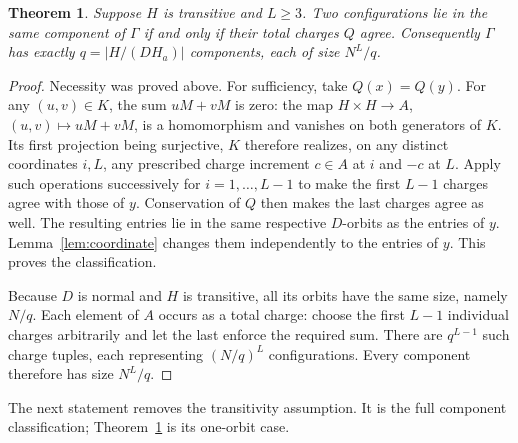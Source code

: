 \documentclass[11pt]{article}
\newtheorem{theorem}{Theorem}
\theoremstyle{remark}
\begin{document}
\begin{theorem}\label{thm:components}
Suppose $H$ is transitive and $L\geq3$. Two configurations lie in the same
component of $\Gamma$ if and only if their total charges $Q$ agree.
Consequently $\Gamma$ has exactly $q=|H/(D H_a)|$ components, each of size
$N^L/q$.
\end{theorem}
\begin{proof}
Necessity was proved above. For sufficiency, take $Q(x)=Q(y)$.
For any $(u,v)\in K$, the sum $uM+vM$ is zero: the map
$H\times H\to A$, $(u,v)\mapsto uM+vM$, is a homomorphism and vanishes on
both generators of $K$.
Its first projection being surjective, $K$ therefore realizes, on any distinct
coordinates $i,L$, any prescribed charge increment $c\in A$ at $i$ and $-c$
at $L$. Apply such operations successively for $i=1,\ldots,L-1$ to make the
first $L-1$ charges agree with those of $y$.
Conservation of $Q$ then makes the last charges agree as well.
The resulting entries lie in the same respective $D$-orbits as the entries of
$y$. Lemma~\ref{lem:coordinate} changes them independently to the entries of
$y$. This proves the classification.

Because $D$ is normal and $H$ is transitive, all its orbits have the same size,
namely $N/q$. Each element of $A$ occurs as a total charge: choose the first
$L-1$ individual charges arbitrarily and let the last enforce the required
sum. There are $q^{L-1}$ such charge tuples, each representing $(N/q)^L$
configurations. Every component therefore has size $N^L/q$.
\end{proof}

The next statement removes the transitivity assumption. It is the full
component classification; Theorem~\ref{thm:components} is its one-orbit case.
\end{document}
